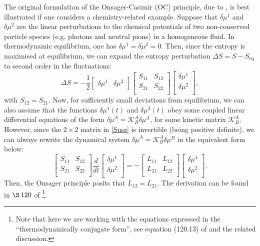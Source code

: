 \documentclass[a4paper, amsfonts, amssymb, amsmath, reprint, showkeys, nofootinbib, twoside, onecolumn,notitlepage]{revtex4-1}
\begin{document}
The original formulation of the Onsager-Casimir (OC) principle, due to \citet{Onsager_1931}, is best illustrated if one considers a chemistry-related example. Suppose that $\delta\mu^1$ and $\delta\mu^2$ are the linear perturbations to the chemical potentials of two non-conserved particle species (e.g. photons and neutral pions) in a homogeneous fluid. In thermodynamic equilibrium, one has $\delta\mu^1=\delta\mu^2=0$. Then, since the entropy is maximised at equilibrium, we can expand the entropy perturbation $\Delta S=S-S_{\text{eq}}$ to second order in the fluctuations:
\begin{equation}\label{Susz}
\Delta S= -\dfrac{1}{2} 
\begin{bmatrix}
\delta\mu^1 &  \delta\mu^2
\end{bmatrix}
\begin{bmatrix}
S_{11} & S_{12} \\
S_{21} & S_{22}  \\
\end{bmatrix}
\begin{bmatrix}
\delta \mu^1 \\
\delta \mu^2 \\
\end{bmatrix} ,
\end{equation} 
with $S_{12}=S_{21}$. Now, for sufficiently small deviations from equilibrium, we can also assume that the functions $\delta\mu^1(t)$ and $\delta\mu^2(t)$ obey some coupled linear differential equations of the form $ \delta\dot{\mu}^A = \mathcal{K}^A_B  \delta\mu^A$, for some kinetic matrix $\mathcal{K}^A_B$. However, since the $2 \times 2$ matrix in \eqref{Susz} is invertible (being positive definite), we can always rewrite the  dynamical system $ \delta \dot{\mu}^A = \mathcal{K}^A_B \delta\mu^B$ in the equivalent form below:
\begin{equation}
\begin{bmatrix}
S_{11} & S_{12} \\
S_{21} & S_{22}  \\
\end{bmatrix}
\dfrac{d}{dt}
\begin{bmatrix}
 \delta \mu^1 \\
\delta \mu^2 \\
\end{bmatrix}
= -
\begin{bmatrix}
L_{11} & L_{12} \\
L_{21} & L_{22}  \\
\end{bmatrix}
\begin{bmatrix}
\delta \mu^1 \\
\delta \mu^2 \\
\end{bmatrix} .
\end{equation} 
Then, the Onsager principle posits that $L_{12}=L_{21}$. The derivation can be found in $\S \, 120$ of \citet{landau5}\footnote{Note that here we are working with the equations expressed in the ``thermodynamically conjugate form'', see equation (120.13) of \citet{landau5} and the related discussion.}.
\end{document}
